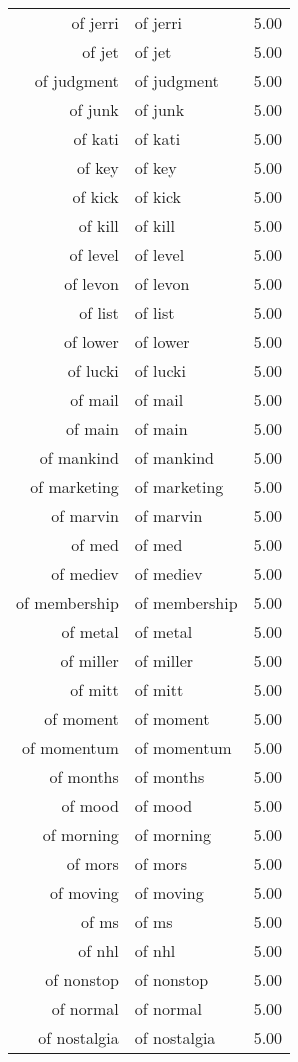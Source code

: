 \begin{table}[ht]
\begin{tabular}{rlr}
  of jerri & of jerri & 5.00 \\ 
  of jet & of jet & 5.00 \\ 
  of judgment & of judgment & 5.00 \\ 
  of junk & of junk & 5.00 \\ 
  of kati & of kati & 5.00 \\ 
  of key & of key & 5.00 \\ 
  of kick & of kick & 5.00 \\ 
  of kill & of kill & 5.00 \\ 
  of level & of level & 5.00 \\ 
  of levon & of levon & 5.00 \\ 
  of list & of list & 5.00 \\ 
  of lower & of lower & 5.00 \\ 
  of lucki & of lucki & 5.00 \\ 
  of mail & of mail & 5.00 \\ 
  of main & of main & 5.00 \\ 
  of mankind & of mankind & 5.00 \\ 
  of marketing & of marketing & 5.00 \\ 
  of marvin & of marvin & 5.00 \\ 
  of med & of med & 5.00 \\ 
  of mediev & of mediev & 5.00 \\ 
  of membership & of membership & 5.00 \\ 
  of metal & of metal & 5.00 \\ 
  of miller & of miller & 5.00 \\ 
  of mitt & of mitt & 5.00 \\ 
  of moment & of moment & 5.00 \\ 
  of momentum & of momentum & 5.00 \\ 
  of months & of months & 5.00 \\ 
  of mood & of mood & 5.00 \\ 
  of morning & of morning & 5.00 \\ 
  of mors & of mors & 5.00 \\ 
  of moving & of moving & 5.00 \\ 
  of ms & of ms & 5.00 \\ 
  of nhl & of nhl & 5.00 \\ 
  of nonstop & of nonstop & 5.00 \\ 
  of normal & of normal & 5.00 \\ 
  of nostalgia & of nostalgia & 5.00 \\ 

\end{tabular}
\end{table}
